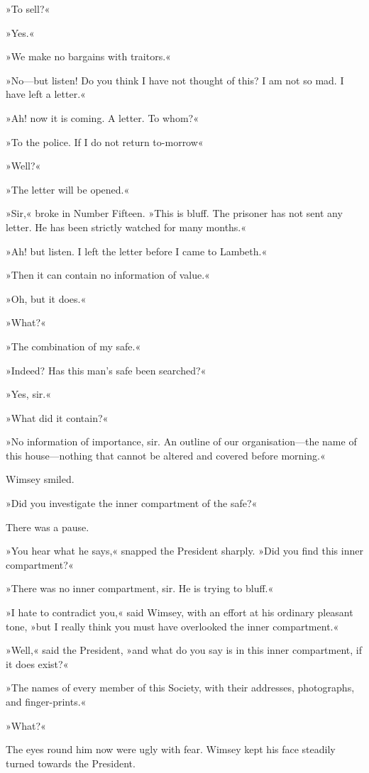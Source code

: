 »To sell?«

»Yes.«

»We make no bargains with traitors.«

»No—but listen! Do you think I have not thought of this? I am not so mad. I have left a letter.«

»Ah! now it is coming. A letter. To whom?«

»To the police. If I do not return to-morrow\longdash«

»Well?«

»The letter will be opened.«

»Sir,« broke in Number Fifteen. »This is bluff. The prisoner has not sent any letter. He has been strictly watched for many months.«

»Ah! but listen. I left the letter before I came to Lambeth.«

»Then it can contain no information of value.«

»Oh, but it does.«

»What?«

»The combination of my safe.«

»Indeed? Has this man's safe been searched?«

»Yes, sir.«

»What did it contain?«

»No information of importance, sir. An outline of our organisation—the name of this house—nothing that cannot be altered and covered before morning.«

Wimsey smiled.

»Did you investigate the inner compartment of the safe?«

There was a pause.

»You hear what he says,« snapped the President sharply. »Did you find this inner compartment?«

»There was no inner compartment, sir. He is trying to bluff.«

»I hate to contradict you,« said Wimsey, with an effort at his ordinary pleasant tone, »but I really think you must have overlooked the inner compartment.«

»Well,« said the President, »and what do you say is in this inner compartment, if it does exist?«

»The names of every member of this Society, with their addresses, photographs, and finger-prints.«

»What?«

The eyes round him now were ugly with fear. Wimsey kept his face steadily turned towards the President.

